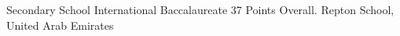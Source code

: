 

\begin{cvhonors}


  \cvhonor
    {Secondary School International Baccalaureate} %
    {37 Points Overall.} %
    {Repton School, United Arab Emirates} %
    {} %

\end{cvhonors}
